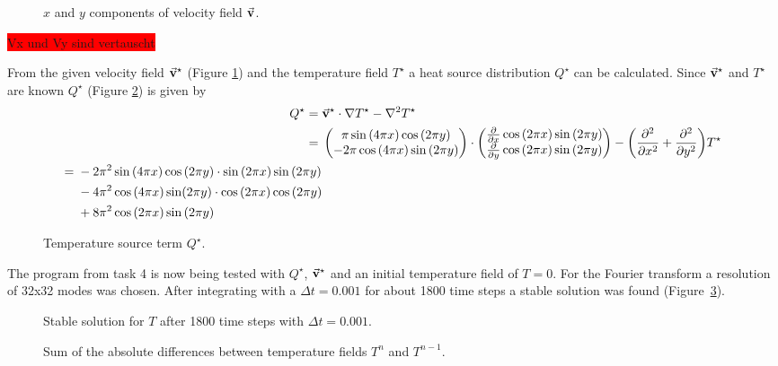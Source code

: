 \documentclass[12pt,a4paper,titlepage,headinclude,bibtotoc]{scrartcl}
\begin{document}
\begin{figure}[H]
    \centering
    
    \caption{$x$ and $y$ components of velocity field $\va{v}$.}
    \label{fig:task5_velocity}
\end{figure}
\colorbox{red}{Vx und Vy sind vertauscht}

From the given velocity field $\va{v}^\star$ (Figure \ref{fig:task5_velocity}) and the temperature field $T^\star$ a heat source distribution $Q^\star$ can be calculated.
Since $\va{v}^\star$ and $T^\star$ are known $Q^\star$ (Figure \ref{fig:task5_q_star}) is given by
\begin{align}
    Q^\star ={}&\va{v}^\star\cdot\nabla T^\star - \nabla^2T^\star\\
    ={}&\begin{pmatrix}\pi\sin\qty(4\pi x)\cos\qty(2 \pi y)\\ -2\pi\cos\qty(4\pi x)\sin\qty(2 \pi y)\end{pmatrix}\cdot\begin{pmatrix}\pdv{}{x}\cos\qty(2\pi x)\sin\qty(2 \pi y)\\\pdv{}{y}\cos\qty(2\pi x)\sin\qty(2 \pi y)\end{pmatrix} - \qty(\pdv[2]{}{x} + \pdv[2]{}{y})T^\star\\
    \begin{split}
        ={}& -2\pi^2\sin\qty(4\pi x)\cos\qty(2\pi y)\cdot \sin\qty(2\pi x)\sin\qty(2\pi y) \\
        &- 4\pi^2\cos\qty(4\pi x)\sin(2\pi y)\cdot\cos\qty(2\pi x)\cos\qty(2\pi y) \\
        &+8\pi^2\cos\qty(2\pi x)\sin\qty(2\pi y) 
    \end{split}
\end{align}
\begin{figure}[H]
    \centering
    
    \caption{Temperature source term $Q^\star$.}
    \label{fig:task5_q_star}
\end{figure}
The program from task 4 is now being tested with $Q^\star$, $\va{v}^\star$ and an initial temperature field of $T=0$.
For the Fourier transform a resolution of 32x32 modes was chosen.
After integrating with a $\Delta t = 0.001$ for about 1800 time steps a stable solution was found \mbox{(Figure \ref{fig:task5_stable})}.
\begin{figure}[H]
    \centering
    
    \caption{Stable solution for $T$ after 1800 time steps with $\Delta t = 0.001$.}
    \label{fig:task5_stable}
\end{figure}
\begin{figure}[H]
    \centering
    
    \caption{Sum of the absolute differences between temperature fields $T^n$ and $T^{n-1}$.}
    \label{fig:task5_stability}
\end{figure}
\end{document}
